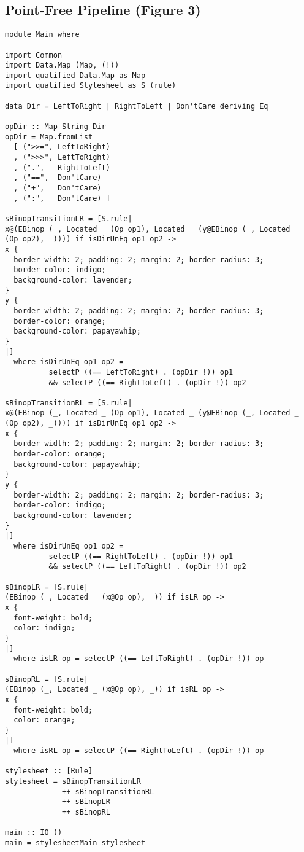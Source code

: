 \documentclass[acmsmall, screen]{acmart}
\begin{document}
\subsection{Point-Free Pipeline (Figure 3)}
\label{sec:listing-pipeline}
{\scriptsize
\begin{verbatim}
module Main where

import Common
import Data.Map (Map, (!))
import qualified Data.Map as Map
import qualified Stylesheet as S (rule)

data Dir = LeftToRight | RightToLeft | Don'tCare deriving Eq

opDir :: Map String Dir
opDir = Map.fromList
  [ (">>=", LeftToRight)
  , (">>>", LeftToRight)
  , (".",   RightToLeft)
  , ("==",  Don'tCare)
  , ("+",   Don'tCare)
  , (":",   Don'tCare) ]

sBinopTransitionLR = [S.rule|
x@(EBinop (_, Located _ (Op op1), Located _ (y@EBinop (_, Located _ (Op op2), _)))) if isDirUnEq op1 op2 ->
x {
  border-width: 2; padding: 2; margin: 2; border-radius: 3;
  border-color: indigo;
  background-color: lavender;
}
y {
  border-width: 2; padding: 2; margin: 2; border-radius: 3;
  border-color: orange;
  background-color: papayawhip;
}
|]
  where isDirUnEq op1 op2 =
          selectP ((== LeftToRight) . (opDir !)) op1
          && selectP ((== RightToLeft) . (opDir !)) op2

sBinopTransitionRL = [S.rule|
x@(EBinop (_, Located _ (Op op1), Located _ (y@EBinop (_, Located _ (Op op2), _)))) if isDirUnEq op1 op2 ->
x {
  border-width: 2; padding: 2; margin: 2; border-radius: 3;
  border-color: orange;
  background-color: papayawhip;
}
y {
  border-width: 2; padding: 2; margin: 2; border-radius: 3;
  border-color: indigo;
  background-color: lavender;
}
|]
  where isDirUnEq op1 op2 =
          selectP ((== RightToLeft) . (opDir !)) op1
          && selectP ((== LeftToRight) . (opDir !)) op2

sBinopLR = [S.rule|
(EBinop (_, Located _ (x@Op op), _)) if isLR op ->
x {
  font-weight: bold;
  color: indigo;
}
|]
  where isLR op = selectP ((== LeftToRight) . (opDir !)) op

sBinopRL = [S.rule|
(EBinop (_, Located _ (x@Op op), _)) if isRL op ->
x {
  font-weight: bold;
  color: orange;
}
|]
  where isRL op = selectP ((== RightToLeft) . (opDir !)) op

stylesheet :: [Rule]
stylesheet = sBinopTransitionLR
             ++ sBinopTransitionRL
             ++ sBinopLR
             ++ sBinopRL

main :: IO ()
main = stylesheetMain stylesheet

\end{verbatim}}
\clearpage
\end{document}
